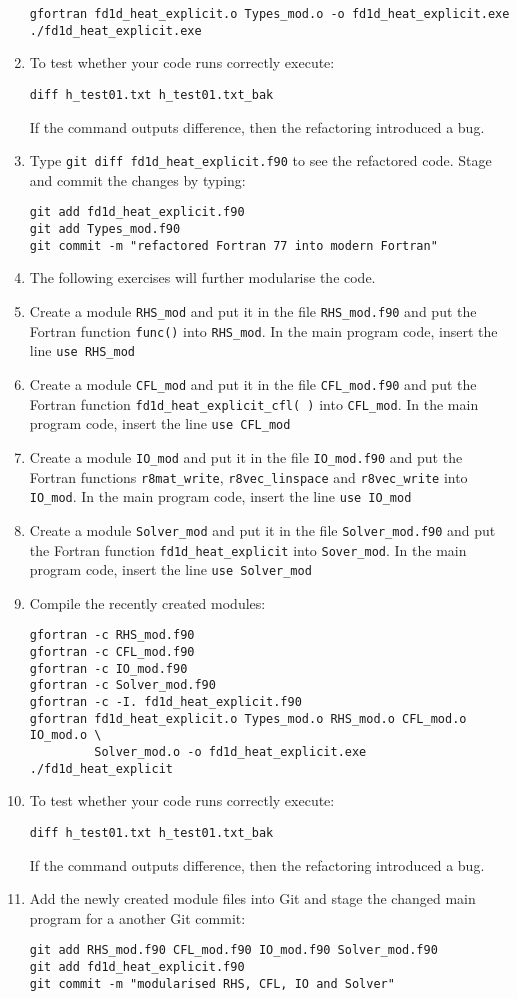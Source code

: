 \documentclass[12pt]{article}
\begin{document}
\begin{enumerate}
\begin{verbatim}
gfortran fd1d_heat_explicit.o Types_mod.o -o fd1d_heat_explicit.exe
./fd1d_heat_explicit.exe
\end{verbatim}
\item To test whether your code runs correctly execute:
\begin{verbatim}
diff h_test01.txt h_test01.txt_bak
\end{verbatim}
If the command outputs difference, then the refactoring introduced a bug.
\item Type \texttt{git diff fd1d\_heat\_explicit.f90} to see the refactored code. Stage and commit
the changes by typing: 
\begin{verbatim}
git add fd1d_heat_explicit.f90
git add Types_mod.f90
git commit -m "refactored Fortran 77 into modern Fortran"
\end{verbatim}
\item[] The following exercises will further modularise the code. 
\item Create a module \texttt{RHS\_mod} and put it in the file \texttt{RHS\_mod.f90} and put the 
Fortran function \texttt{func()} into \texttt{RHS\_mod}. In the main program code, 
insert the line \texttt{use RHS\_mod} 
\item Create a module \texttt{CFL\_mod} and put it in the file \texttt{CFL\_mod.f90} and put the
Fortran function \texttt{fd1d\_heat\_explicit\_cfl( )} into \texttt{CFL\_mod}. In the main program
code, insert the line \texttt{use CFL\_mod}
\item Create a module \texttt{IO\_mod} and put it in the file \texttt{IO\_mod.f90} and put
the Fortran functions \texttt{r8mat\_write}, \texttt{r8vec\_linspace} and \texttt{r8vec\_write} into \texttt{IO\_mod}.
In the main program code, insert the line \texttt{use IO\_mod}
\item Create a module \texttt{Solver\_mod} and put it in the file \texttt{Solver\_mod.f90} and put the
  Fortran function \texttt{fd1d\_heat\_explicit} into \texttt{Sover\_mod}. In the main program code,
  insert the line \texttt{use Solver\_mod}
\item Compile the recently created modules:
\begin{verbatim}
gfortran -c RHS_mod.f90
gfortran -c CFL_mod.f90
gfortran -c IO_mod.f90
gfortran -c Solver_mod.f90
gfortran -c -I. fd1d_heat_explicit.f90
gfortran fd1d_heat_explicit.o Types_mod.o RHS_mod.o CFL_mod.o IO_mod.o \
         Solver_mod.o -o fd1d_heat_explicit.exe
./fd1d_heat_explicit
\end{verbatim}
\item To test whether your code runs correctly execute:
\begin{verbatim}
diff h_test01.txt h_test01.txt_bak
\end{verbatim}
If the command outputs difference, then the refactoring introduced a bug.
\item Add the newly created module files into Git and stage the changed main program for a
another Git commit:
\begin{verbatim}
git add RHS_mod.f90 CFL_mod.f90 IO_mod.f90 Solver_mod.f90
git add fd1d_heat_explicit.f90
git commit -m "modularised RHS, CFL, IO and Solver"
\end{verbatim}
%
\end{enumerate}
\newpage
\end{document}
